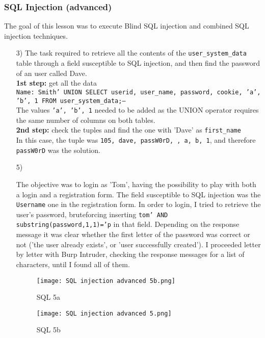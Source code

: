 \documentclass{article}
\begin{document}
\subsubsection{SQL Injection (advanced)}
The goal of this lesson was to execute Blind SQL injection and combined SQL injection techniques.
\begin{itemize}
    \item[3)] {The task required to retrieve all the contents of the \texttt{user\_system\_data} table through a field susceptible to SQL injection, and then find the password of an user called Dave.\\
    \textbf{1st step:} get all the data\\
    \texttt{Name: Smith' UNION SELECT userid, user\_name, password, cookie, 'a', 'b', 1 FROM user\_system\_data;--}\\
    The values \texttt{'a', 'b', 1} needed to be added as the UNION operator requires the same number of columns on both tables.\\
    \textbf{2nd step:} check the tuples and find the one with 'Dave' as \texttt{first\_name}\\
    In this case, the tuple was \texttt{105, dave, passW0rD, , a, b, 1}, and therefore \texttt{passW0rD} was the solution.}
    
    \item[5)] {The objective was to login as 'Tom', having the possibility to play with both a login and a registration form.
    The field susceptible to SQL injection was the \texttt{Username} one in the registration form.
    In order to login, I tried to retrieve the user's password, bruteforcing inserting \texttt{tom' AND substring(password,1,1)='p} in that field.
    Depending on the response message it was clear whether the first letter of the password was correct or not ('the user already exists', or 'user successfully created').
    I proceeded letter by letter with Burp Intruder, checking the response messages for a list of characters, until I found all of them.
    \begin{figure}[H]
        \centering
        \texttt{[image: SQL injection advanced 5b.png]}
        \caption{SQL 5a}
        \label{fig:SQL 5}
    \end{figure}
    \begin{figure}[H]
        \centering
        \texttt{[image: SQL injection advanced 5.png]}
        \caption{SQL 5b}
        \label{fig:SQL 5}
    \end{figure}
    }
    

\end{itemize}
\end{document}
